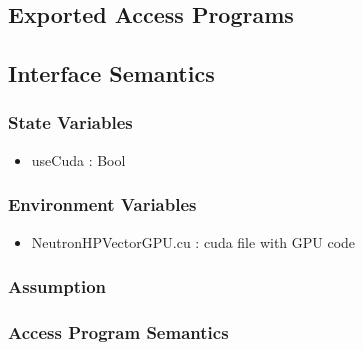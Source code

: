 \documentclass[12pt]{article}
\begin{document}
\subsection{Exported Access Programs}%

\subsection{Interface Semantics}

\subsubsection{State Variables}%
\begin{itemize}
\item useCuda : Bool
\end{itemize}

\subsubsection{Environment Variables}%
\begin{itemize}
\item NeutronHPVectorGPU.cu : cuda file with GPU code
\end{itemize}


\subsubsection{Assumption}%

\subsubsection{Access Program Semantics}%
\end{document}
